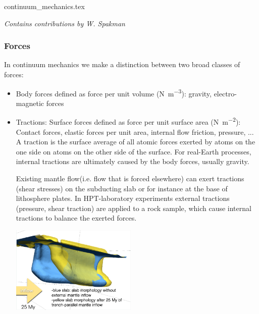 \begin{flushright} {\tiny {\color{gray} continuum\_mechanics.tex}} \end{flushright}

{\sl Contains contributions by W. Spakman} 

\subsubsection{Forces}

In continuum mechanics we make a distinction between two broad classes of forces:
\begin{itemize}
\item Body forces defined as force per unit volume (\si{\newton\per\cubic\metre}): 
gravity, electro-magnetic forces
\item Tractions: Surface forces defined as force per unit surface area (\si{\newton\per\square\metre}):
Contact forces, elastic forces per unit area, internal flow friction, pressure, ...\\
A traction is the surface average of all atomic forces exerted by
atoms on the one side on atoms on the other side of the surface.
For real-Earth processes, internal tractions are ultimately caused by
the body forces, usually gravity.


Existing mantle flow(i.e. flow that is forced elsewhere) can exert
tractions (shear stresses) on the subducting slab or for instance at
the base of lithosphere plates.
In HPT-laboratory experiments external tractions (pressure, shear
traction) are applied to a rock sample, which cause internal
tractions to balance the exerted forces.

\begin{center}
\includegraphics[width=6cm]{images/contmech/spak1}
\end{center}
\end{itemize}

